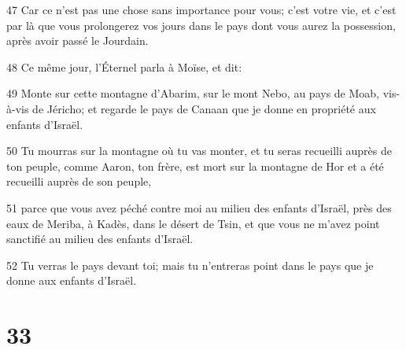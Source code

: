 \par 47 Car ce n'est pas une chose sans importance pour vous; c'est votre vie, et c'est par là que vous prolongerez vos jours dans le pays dont vous aurez la possession, après avoir passé le Jourdain.
\par 48 Ce même jour, l'Éternel parla à Moïse, et dit:
\par 49 Monte sur cette montagne d'Abarim, sur le mont Nebo, au pays de Moab, vis-à-vis de Jéricho; et regarde le pays de Canaan que je donne en propriété aux enfants d'Israël.
\par 50 Tu mourras sur la montagne où tu vas monter, et tu seras recueilli auprès de ton peuple, comme Aaron, ton frère, est mort sur la montagne de Hor et a été recueilli auprès de son peuple,
\par 51 parce que vous avez péché contre moi au milieu des enfants d'Israël, près des eaux de Meriba, à Kadès, dans le désert de Tsin, et que vous ne m'avez point sanctifié au milieu des enfants d'Israël.
\par 52 Tu verras le pays devant toi; mais tu n'entreras point dans le pays que je donne aux enfants d'Israël.

\chapter{33}

